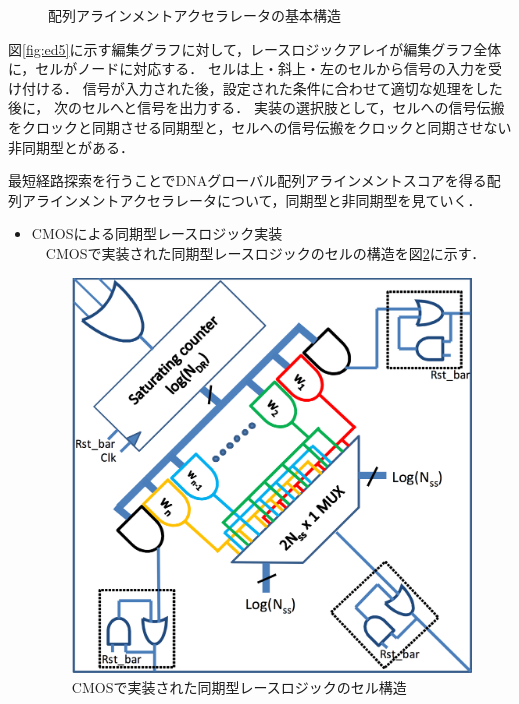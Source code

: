 \begin{figure}[t!]
\begin{center}
\caption{配列アラインメントアクセラレータの基本構造}
\label{fig:racelogicarray}
\end{center}
\end{figure}
図\ref{fig:ed5}に示す編集グラフに対して，レースロジックアレイが編集グラフ全体に，セルがノードに対応する．
セルは上・斜上・左のセルから信号の入力を受け付ける．
信号が入力された後，設定された条件に合わせて適切な処理をした後に，
次のセルへと信号を出力する．
実装の選択肢として，セルへの信号伝搬をクロックと同期させる同期型と，セルへの信号伝搬をクロックと同期させない非同期型とがある．

最短経路探索を行うことでDNAグローバル配列アラインメントスコアを得る配列アラインメントアクセラレータについて，同期型と非同期型を見ていく．

\begin{itemize}
\item CMOSによる同期型レースロジック実装\\
\ \ CMOSで実装された同期型レースロジックのセルの構造を図\ref{fig:CMOSsync}に示す．\\
\begin{figure}[t!]
\begin{center}
\includegraphics[keepaspectratio,scale=0.3]{fig/2/CMOSsync.png}
\caption{CMOSで実装された同期型レースロジックのセル構造\cite{madhavan2014race}}
\label{fig:CMOSsync}
\end{center}

\end{figure}
\end{itemize}
